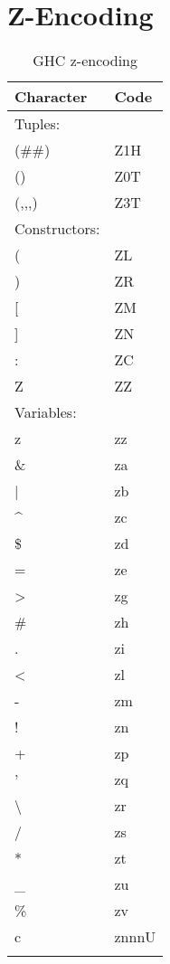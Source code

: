 
\section{Z-Encoding}
\label{zencoding}

\begin{center}
\begin{scriptsize}
\begin{longtable}{ |l|l| }

\hline
Character 	& Code	\\
\hline
Tuples:		& 	\\

(\#\#)		& Z1H	\\
()		& Z0T	\\
(,,,)		& Z3T	\\

\hline
Constructors:	&	\\
(		& ZL	\\
)		& ZR	\\
{[}		& ZM	\\
{]}		& ZN	\\
:		& ZC	\\
Z		& ZZ	\\
\hline
Variables:	&	\\
z		& zz	\\	
\&		& za	\\
|		& zb	\\
\^{}		& zc	\\
\$		& zd	\\
=		& ze	\\
>		& zg	\\
\#		& zh	\\
.		& zi	\\
<		& zl	\\
-		& zm	\\
!		& zn	\\
+		& zp	\\
'		& zq	\\
\textbackslash	& zr	\\
/		& zs	\\
{*}		& zt	\\
\_		& zu	\\
\%		& zv	\\
c		& znnnU	\\
\hline

\caption{GHC z-encoding}
\label{thezencoding}

\end{longtable}
\end{scriptsize}
\end{center}

